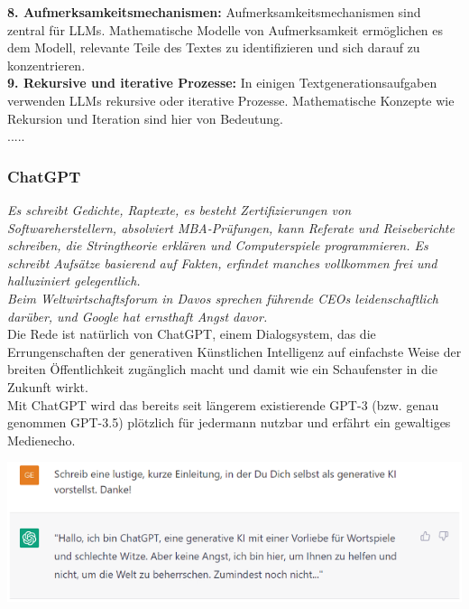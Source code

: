 \documentclass[12pt]{article}
\begin{document}
\textbf{8. Aufmerksamkeitsmechanismen:} Aufmerksamkeitsmechanismen sind zentral für LLMs. Mathematische Modelle von Aufmerksamkeit ermöglichen es dem Modell, relevante Teile des Textes zu identifizieren und sich darauf zu konzentrieren.\\

\textbf{9. Rekursive und iterative Prozesse:} In einigen Textgenerationsaufgaben verwenden LLMs rekursive oder iterative Prozesse. Mathematische Konzepte wie Rekursion und Iteration sind hier von Bedeutung.\\

.....\\
\subsubsection{ChatGPT}

\textit{Es schreibt Gedichte, Raptexte, es besteht Zertifizierungen von Softwareherstellern, absolviert MBA-Prüfungen, kann Referate und Reiseberichte schreiben, die Stringtheorie erklären und Computerspiele programmieren. Es schreibt Aufsätze basierend auf Fakten, erfindet manches vollkommen frei und halluziniert gelegentlich. \\
Beim Weltwirtschaftsforum in Davos sprechen führende CEOs leidenschaftlich darüber, und Google hat ernsthaft Angst davor.}\\


Die Rede ist natürlich von ChatGPT, einem Dialogsystem, das die Errungenschaften der generativen Künstlichen Intelligenz auf einfachste Weise der breiten Öffentlichkeit zugänglich macht und damit wie ein Schaufenster in die Zukunft wirkt. \\
Mit ChatGPT wird das bereits seit längerem existierende GPT-3 (bzw.
genau genommen GPT-3.5) plötzlich für jedermann nutzbar und erfährt ein gewaltiges Medienecho.

\begin{center}
\includegraphics{ChatGPT-Text1} 
\end{center}


\newpage
\end{document}
